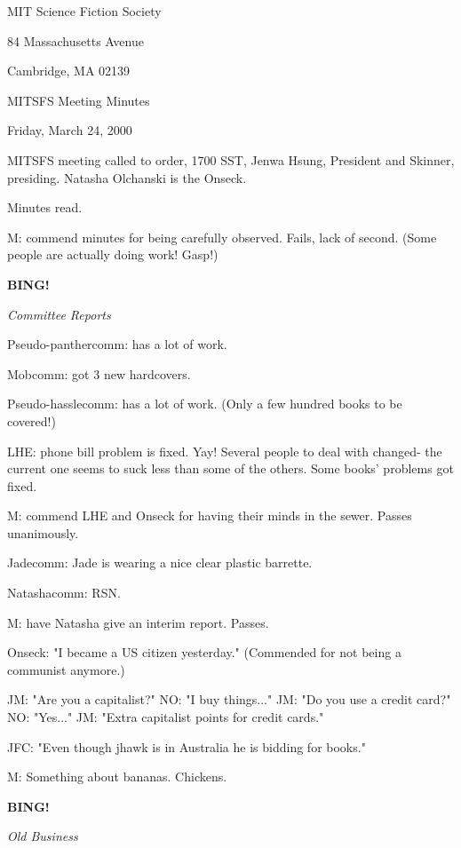 \documentclass[12pt]{article}
\newcommand{\bing}{{\bf BING!} }
\newcommand{\goto}[1]{\bing \vskip 12pt \centerline{{\em{#1}}}}
\begin{document}
\begin{center}

MIT Science Fiction Society 

84 Massachusetts Avenue

Cambridge, MA 02139

\vspace{12pt}

MITSFS Meeting Minutes 

Friday, March 24, 2000

\end{center}
 
\vspace{18pt}

\setlength{\parskip}{6pt}

\noindent
MITSFS meeting called to order, 1700 SST, Jenwa Hsung, President and
Skinner, presiding.  Natasha Olchanski is the Onseck.

Minutes read.

M: commend minutes for being carefully observed. Fails, lack of second. (Some people are actually doing work! Gasp!)

\goto{Committee Reports}

Pseudo-panthercomm: has a lot of work.

Mobcomm: got 3 new hardcovers.

Pseudo-hasslecomm: has a lot of work. (Only a few hundred books to be covered!)

LHE: phone bill problem is fixed. Yay! Several people to deal with changed- the current one seems to suck less than some of the others. Some books' problems got fixed.

M: commend LHE and Onseck for having their minds in the sewer. Passes unanimously.

Jadecomm: Jade is wearing a nice clear plastic barrette.

Natashacomm: RSN.

M: have Natasha give an interim report. Passes.

Onseck: "I became a US citizen yesterday." (Commended for not being a communist anymore.)

JM: "Are you a capitalist?" NO: "I buy things..." JM: "Do you use a credit card?" NO: "Yes..." JM: "Extra capitalist points for credit cards."

JFC: "Even though jhawk is in Australia he is bidding for books."

M: Something about bananas. Chickens.

\goto{Old Business}
\end{document}
